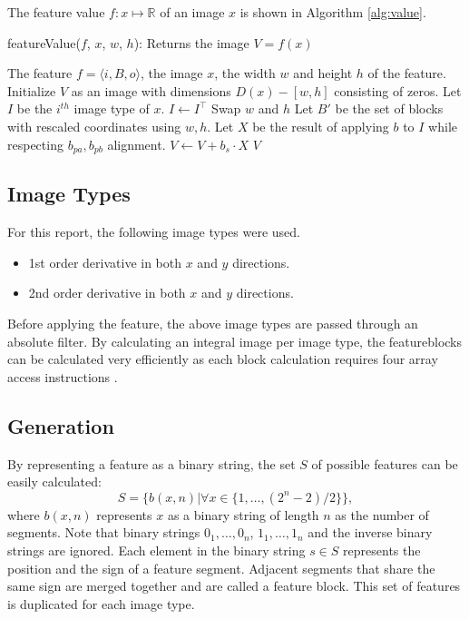 \documentclass[a4paper,11pt]{article}
\begin{document}
The feature value $f:x\mapsto\mathbb{R}$ of an image $x$ is shown in Algorithm
\ref{alg:value}.
\begin{algorithm}[!htb]
	\caption{featureValue($f$, $x$, $w$, $h$): Returns the image $V = f(x)$}
	\begin{algorithmic}[1]
	\REQUIRE The feature $f = \langle i, B, o \rangle$, the image $x$, the width $w$ and height $h$ of the feature.
	\medskip
	\STATE Initialize $V$ as an image with dimensions $D(x)-[w, h]$ consisting of zeros.
	\STATE Let $I$ be the $i^{th}$ image type of $x$.
		\STATE $I \leftarrow I^\top$
		\STATE Swap $w$ and $h$
	\ENDIF
	\STATE Let $B'$ be the set of blocks with rescaled coordinates using $w,h$.
		\STATE Let $X$ be the result of applying $b$ to $I$ while respecting $b_{pa}, b_{pb}$ alignment.
		\STATE $V \leftarrow V + b_s \cdot X$
	\ENDFOR
	\RETURN $V$
	\end{algorithmic}
\label{alg:value}
\end{algorithm}

\newpage
\subsection{Image Types} \label{sec:image}
For this report, the following image types were used.
\begin{itemize}
	\item{1st order derivative in both $x$ and $y$ directions.}
	\item{2nd order derivative in both $x$ and $y$ directions.}
\end{itemize}
Before applying the feature, the above image types are passed through an
absolute filter. By calculating an integral image per image type, the
featureblocks can be calculated very efficiently as each block calculation
requires four array access instructions \cite{viola}.

\subsection{Generation} \label{sec:gen}
By representing a feature as a binary string, the set $S$ of possible features
can be easily calculated:
$$S = \{b(x,n) | \forall x \in \{1,\ldots,(2^n-2)/2\}\},$$
where $b(x,n)$ represents $x$ as a binary string of length $n$ as the number of
segments. Note that binary strings $0_1,\ldots,0_n$, $1_1,\ldots,1_n$ and the
inverse binary strings are ignored. Each element in the binary string $s \in S$
represents the position and the sign of a feature segment. Adjacent segments
that share the same sign are merged together and are called a feature block.
This set of features is duplicated for each image type.
\end{document}
